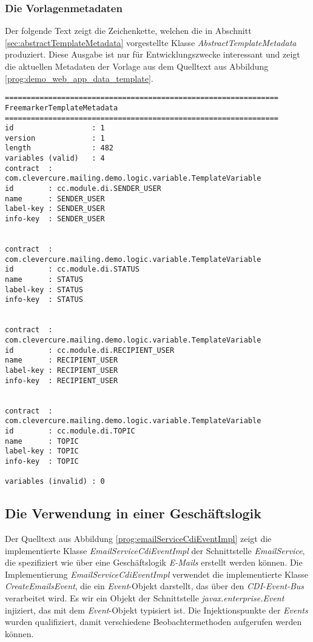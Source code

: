 \subsubsection{Die Vorlagenmetadaten}
Der folgende Text zeigt die Zeichenkette, welchen die in Abschnitt \ref{sec:abstractTemplateMetadata} vorgestellte Klasse \emph{AbstractTemplateMetadata} produziert. Diese Ausgabe ist nur für Entwicklungszwecke interessant und zeigt die aktuellen Metadaten der Vorlage aus dem Quelltext aus Abbildung \ref{prog:demo_web_app_data_template}.

\begingroup
    \fontsize{9pt}{11pt}\selectfont
    \begin{verbatim}  
===============================================================
FreemarkerTemplateMetadata
===============================================================
id                  : 1
version             : 1
length              : 482
variables (valid)   : 4
contract  : com.clevercure.mailing.demo.logic.variable.TemplateVariable
id        : cc.module.di.SENDER_USER
name      : SENDER_USER
label-key : SENDER_USER
info-key  : SENDER_USER


contract  : com.clevercure.mailing.demo.logic.variable.TemplateVariable
id        : cc.module.di.STATUS
name      : STATUS
label-key : STATUS
info-key  : STATUS


contract  : com.clevercure.mailing.demo.logic.variable.TemplateVariable
id        : cc.module.di.RECIPIENT_USER
name      : RECIPIENT_USER
label-key : RECIPIENT_USER
info-key  : RECIPIENT_USER


contract  : com.clevercure.mailing.demo.logic.variable.TemplateVariable
id        : cc.module.di.TOPIC
name      : TOPIC
label-key : TOPIC
info-key  : TOPIC

variables (invalid) : 0
    \end{verbatim}  
\endgroup
\newpage

\subsection{Die Verwendung in einer Geschäftslogik}
Der Quelltext aus Abbildung \ref{prog:emailServiceCdiEventImpl} zeigt die implementierte Klasse \emph{EmailServiceCdiEventImpl} der Schnittstelle \emph{EmailService}, die spezifiziert wie über eine Geschäftslogik \emph{E-Mails} erstellt werden können. Die Implementierung \emph{EmailServiceCdiEventImpl} verwendet die implementierte Klasse \emph{CreateEmailsEvent}, die ein \emph{Event}-Objekt darstellt, das über den \emph{CDI-Event-Bus} verarbeitet wird. Es wir ein Objekt der Schnittstelle \emph{javax.enterprise.Event} injiziert, das mit dem \emph{Event}-Objekt typisiert ist. Die Injektionspunkte der \emph{Events} wurden qualifiziert, damit verschiedene Beobachtermethoden aufgerufen werden können.

